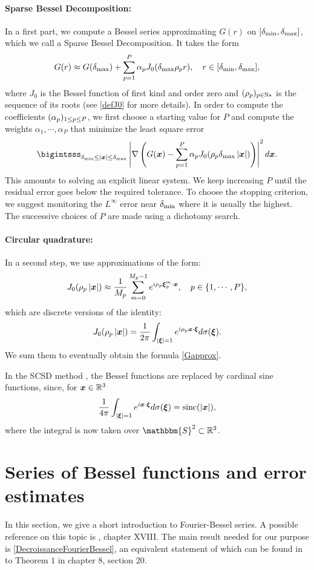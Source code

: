 \documentclass[smallextended]{svjour3}
\begin{document}
\paragraph{Sparse Bessel Decomposition:} In a first part, we compute a Bessel series approximating $G(r)$ on $[\delta_{\min},\delta_{\max}]$, which we call a Sparse Bessel Decomposition. It takes the form
\[G(r) \approx G(\delta_{\max}) + \sum_{p=1}^P \alpha_p J_0(\delta_{\max} \rho_p r), \quad r \in [\delta_{\min},\delta_{\max}],\]
where $J_0$ is the Bessel function of first kind and order zero and $(\rho_p)_{p \in \mathbb{N}*}$ is the sequence of its roots (see \autoref{defJ0} for more details). In order to compute the coefficients $(\alpha_{p})_{1 \leq p \leq P}$, we first choose a starting value for $P$ and compute the weights $\alpha_1,\cdots, \alpha_{P}$ that minimize the least square error
\[\bigintsss_{\rmin \leq |\bs{x}|\leq \rmax} \abs{\nabla \left(G(\bs{x}) - \sum_{p=1}^P \alpha_p J_0(\rho_p \rmax \abs{\bs{x}})\right)}^2 d\bs{x}.\]
This amounts to solving an explicit linear system. We keep increasing $P$ until the residual error goes below the required tolerance. To choose the stopping criterion, we suggest monitoring the $L^{\infty}$ error near $\delta_{\min}$ where it is usually the highest. The successive choices of $P$ are made using a dichotomy search. 
\paragraph{Circular quadrature:}In a second step, we use approximations of the form:
\[J_0(\rho_p \left\lvert \boldsymbol{x} \right\rvert) \approx \dfrac{1}{M_p}\sum_{m=0}^{M_p-1}e^{i \rho_p \boldsymbol{\xi}_p^m \cdot \boldsymbol{x}}, \quad p \in \{1,\cdots,P\},\]
which are discrete versions of the identity:
\[ J_0(\rho_p\left\lvert \boldsymbol{x} \right\rvert) = \frac{1}{2\pi}\int_{\left\lvert \boldsymbol{\xi} \right\rvert=1}{e^{i \rho_p\boldsymbol{x} \cdot \boldsymbol{\xi}}} d\sigma(\boldsymbol{\xi}).\]
We sum them to eventually obtain the formula \eqref{Gapprox}. 
\begin{remark}
	In the SCSD method \cite{Alouges2015}, the Bessel functions are replaced by cardinal sine functions, since, for $\boldsymbol{x} \in \mathbb{R}^3$
	\[ \frac{1}{4\pi}\int_{\left\lvert \boldsymbol{\xi} \right\rvert=1} e^{i \boldsymbol{x}\cdot \boldsymbol{\xi}} d\sigma(\boldsymbol{\xi}) = \textup{sinc}(\left\lvert \boldsymbol{x} \right\rvert),\]
	where the integral is now taken over $\mathbbm{S}^2 \subset \R^3$.
\end{remark}


\section{Series of Bessel functions and error estimates}
\label{sec:FourierBesselSeries}
In this section, we give a short introduction to Fourier-Bessel series. A possible reference on this topic is \cite{watson1995treatise}, chapter XVIII. 
The main result needed for our purpose is \autoref{DecroissanceFourierBessel},  an equivalent statement of which can be found in to Theorem $1$ in \cite{tolstov2012fourier} chapter 8, section 20. 
\end{document}
